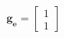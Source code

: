 \documentclass[preview]{standalone}
\begin{document}
\begin{align*}
\mathbf{g_e} = \begin{bmatrix} 1 \\ 1 \end{bmatrix}
\end{align*}
\end{document}

